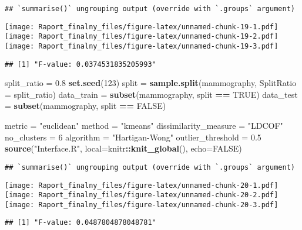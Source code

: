 \documentclass[
]{article}
\newenvironment{Shaded}{\begin{snugshade}}{\end{snugshade}}
\newcommand{\DataTypeTok}[1]{\textcolor[rgb]{0.13,0.29,0.53}{#1}}
\newcommand{\DecValTok}[1]{\textcolor[rgb]{0.00,0.00,0.81}{#1}}
\newcommand{\FloatTok}[1]{\textcolor[rgb]{0.00,0.00,0.81}{#1}}
\newcommand{\KeywordTok}[1]{\textcolor[rgb]{0.13,0.29,0.53}{\textbf{#1}}}
\newcommand{\NormalTok}[1]{#1}
\newcommand{\OperatorTok}[1]{\textcolor[rgb]{0.81,0.36,0.00}{\textbf{#1}}}
\newcommand{\OtherTok}[1]{\textcolor[rgb]{0.56,0.35,0.01}{#1}}
\newcommand{\StringTok}[1]{\textcolor[rgb]{0.31,0.60,0.02}{#1}}
\begin{document}
\begin{verbatim}
## `summarise()` ungrouping output (override with `.groups` argument)
\end{verbatim}

\texttt{[image: Raport\_finalny\_files/figure-latex/unnamed-chunk-19-1.pdf]}
\texttt{[image: Raport\_finalny\_files/figure-latex/unnamed-chunk-19-2.pdf]}
\texttt{[image: Raport\_finalny\_files/figure-latex/unnamed-chunk-19-3.pdf]}

\begin{verbatim}
## [1] "F-value: 0.0374531835205993"
\end{verbatim}

\begin{Shaded}
\begin{Highlighting}[]
\NormalTok{split_ratio =}\StringTok{ }\FloatTok{0.8}
\KeywordTok{set.seed}\NormalTok{(}\DecValTok{123}\NormalTok{)}
\NormalTok{split =}\StringTok{ }\KeywordTok{sample.split}\NormalTok{(mammography, }\DataTypeTok{SplitRatio =}\NormalTok{ split_ratio)}
\NormalTok{data_train =}\StringTok{ }\KeywordTok{subset}\NormalTok{(mammography, split }\OperatorTok{==}\StringTok{ }\OtherTok{TRUE}\NormalTok{)}
\NormalTok{data_test =}\StringTok{ }\KeywordTok{subset}\NormalTok{(mammography, split }\OperatorTok{==}\StringTok{ }\OtherTok{FALSE}\NormalTok{)}

\NormalTok{metric =}\StringTok{ "euclidean"}
\NormalTok{method =}\StringTok{ "kmeans"}
\NormalTok{dissimilarity_measure =}\StringTok{ "LDCOF"}
\NormalTok{no_clusters =}\StringTok{ }\DecValTok{6}
\NormalTok{algorithm =}\StringTok{ "Hartigan-Wong"}
\NormalTok{outlier_threshold =}\StringTok{ }\FloatTok{0.5}
\KeywordTok{source}\NormalTok{(}\StringTok{"Interface.R"}\NormalTok{, }\DataTypeTok{local=}\NormalTok{knitr}\OperatorTok{::}\KeywordTok{knit_global}\NormalTok{(), }\DataTypeTok{echo=}\OtherTok{FALSE}\NormalTok{)}
\end{Highlighting}
\end{Shaded}

\begin{verbatim}
## `summarise()` ungrouping output (override with `.groups` argument)
\end{verbatim}

\texttt{[image: Raport\_finalny\_files/figure-latex/unnamed-chunk-20-1.pdf]}
\texttt{[image: Raport\_finalny\_files/figure-latex/unnamed-chunk-20-2.pdf]}
\texttt{[image: Raport\_finalny\_files/figure-latex/unnamed-chunk-20-3.pdf]}

\begin{verbatim}
## [1] "F-value: 0.0487804878048781"
\end{verbatim}
\end{document}

